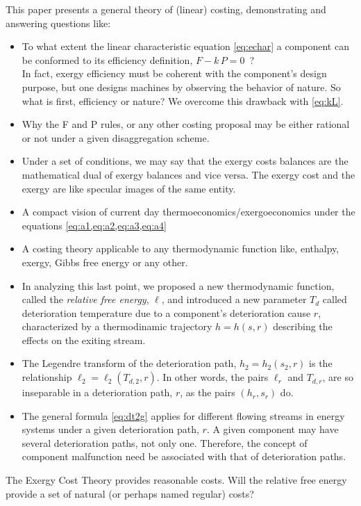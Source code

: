 \documentclass[energies,article,submit,moreauthors,pdftex]{Definitions/mdpi}
\begin{document}
This paper presents a general theory of (linear) costing, demonstrating and answering questions like:
\begin{itemize}
	\item To what extent the linear characteristic equation \eqref{eq:echar} a component can be conformed to its efficiency definition, $F - k\, P = 0$~?\\
	In fact, exergy efficiency must be coherent with the component's design purpose, but one designs machines by observing the behavior of nature. So what is first, efficiency or nature? We overcome this drawback with \cref{eq:kL}.
	\item Why the F and P rules, or any other costing proposal may be either rational or not under a given disaggregation scheme.
	\item Under a set of conditions, we may say that the exergy costs balances are the mathematical dual of exergy balances and vice versa. The exergy cost and the exergy are like specular images of the same entity.
	\item A compact vision of current day thermoeconomics/exergoeconomics under the equations \cref{eq:a1,eq:a2,eq:a3,eq:a4}
	\item A costing theory applicable to any thermodynamic function like, enthalpy, exergy, Gibbs free energy or any other.
	\item In analyzing this last point, we proposed a new thermodynamic function, called the \emph{relative free energy}, $\ell$, and introduced a new parameter $T_d$ called deterioration temperature due to a component’s deterioration cause $r$, characterized by a thermodinamic trajectory $h=h(s, r)$ describing the effects on the exiting stream. 
	\item The Legendre transform of the deterioration path, $h_2=h_2 (s_2, r)$ is the relationship  
	$\ell_2 = \ell_2(T_{d,2} , r)$. In other words, the pairs  $\ell_r$ and $T_{d,r}$, are so inseparable in a deterioration path, $r$, as the pairs $(h_r,s_r)$ do.
	\item The general formula \eqref{eq:dt2g} applies for different flowing streams in energy systems under a given deterioration path, $r$. A given component may have several deterioration paths, not only one. Therefore, the concept of component malfunction need be associated with that of deterioration paths.
\end{itemize}
The Exergy Cost Theory provides reasonable costs. Will the relative free energy provide a set of natural (or perhaps named regular) costs? 
\end{document}
